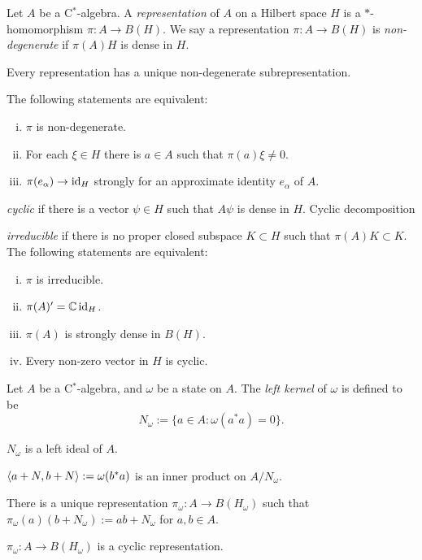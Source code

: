 \documentclass{../../large}
\begin{document}
\begin{prb}
Let $A$ be a C$^*$-algebra.
A \emph{representation} of $A$ on a Hilbert space $H$ is a $*$-homomorphism $\pi:A\to B(H)$.
We say a representation $\pi:A\to B(H)$ is \emph{non-degenerate} if $\pi(A)H$ is dense in $H$.
\begin{parts}
\item Every representation has a unique non-degenerate subrepresentation.
\item The following statements are equivalent:
\begin{enumerate}[(i)]
\item $\pi$ is non-degenerate.
\item For each $\xi\in H$ there is $a\in A$ such that $\pi(a)\xi\ne0$.
\item $\pi(e_\alpha)\to\operatorname{id}_H$ strongly for an approximate identity $e_\alpha$ of $A$.
\end{enumerate}
\end{parts}
\end{prb}

\begin{prb}
\emph{cyclic} if there is a vector $\psi\in H$ such that $A\psi$ is dense in $H$.
Cyclic decomposition
\end{prb}


\begin{prb}
\emph{irreducible} if there is no proper closed subspace $K\subset H$ such that $\pi(A)K\subset K$.
The following statements are equivalent:
\begin{enumerate}[(i)]
\item $\pi$ is irreducible.
\item $\pi(A)'=\mathbb{C}\operatorname{id}_H$.
\item $\pi(A)$ is strongly dense in $B(H)$.
\item Every non-zero vector in $H$ is cyclic.
\end{enumerate}
\end{prb}


\begin{prb}
Let $A$ be a C$^*$-algebra, and $\omega$ be a state on $A$.
The \emph{left kernel} of $\omega$ is defined to be
\[N_\omega:=\{a\in A:\omega(a^*a)=0\}.\]
\begin{parts}
\item $N_\omega$ is a left ideal of $A$.
\item $\langle a+N,b+N\rangle:=\omega(b^*a)$ is an inner product on $A/N_\omega$.
\item There is a unique representation $\pi_\omega:A\to B(H_\omega)$ such that $\pi_\omega(a)(b+N_\omega):=ab+N_\omega$ for $a,b\in A$.
\item $\pi_\omega:A\to B(H_\omega)$ is a cyclic representation.
\end{parts}
\end{prb}
\end{document}
